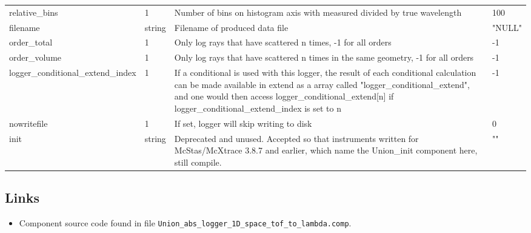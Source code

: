 \begin{longtable}{p{}p{}p{}p{}}
relative\_bins & 1 & Number of bins on histogram axis with measured divided by true wavelength & 100 \\
filename & string & Filename of produced data file & "NULL" \\
order\_total & 1 & Only log rays that have scattered n times, -1 for all orders & -1 \\
order\_volume & 1 & Only log rays that have scattered n times in the same geometry, -1 for all orders & -1 \\
logger\_conditional\_extend\_index & 1 & If a conditional is used with this logger, the result of each conditional calculation can be made available in extend as a array called "logger\_conditional\_extend", and one would then access logger\_conditional\_extend[n] if logger\_conditional\_extend\_index is set to n & -1 \\
nowritefile & 1 & If set, logger will skip writing to disk & 0 \\
init & string & Deprecated and unused. Accepted so that instruments written for McStas/McXtrace 3.8.7 and earlier, which name the Union\_init component here, still compile. & "" \\
\bottomrule
\end{longtable}

\subsection*{Links}
\begin{itemize}
  \item Component source code found in file \texttt{Union\_abs\_logger\_1D\_space\_tof\_to\_lambda.comp}.
\end{itemize}
